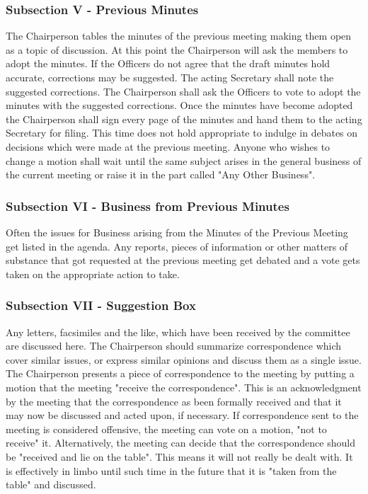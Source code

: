\documentclass[11pt]{article}
\begin{document}
\subsubsection{Subsection V - Previous Minutes}
\label{sec:org00711e0}

The Chairperson tables the minutes of the previous meeting making them open as a topic of discussion. 
At this point the Chairperson will ask the members to adopt the minutes. 
If the Officers do not agree that the draft minutes hold accurate, corrections may be suggested. 
The acting Secretary shall note the suggested corrections. 
The Chairperson shall ask the Officers to vote to adopt the minutes with the suggested corrections.
Once the minutes have become adopted the Chairperson shall sign every page of the minutes and hand them to the acting Secretary for filing.
This time does not hold appropriate to indulge in debates on decisions which were made at the previous meeting. 
Anyone who wishes to change a motion shall wait until the same subject arises in the general business of the current meeting or raise it in the part called "Any Other Business".

\subsubsection{Subsection VI - Business from Previous Minutes}
\label{sec:org1cf2942}

Often the issues for Business arising from the Minutes of the Previous Meeting get listed in the agenda. 
Any reports, pieces of information or other matters of substance that got requested at the previous meeting get debated and a vote gets taken on the appropriate action to take.

\subsubsection{Subsection VII - Suggestion Box}
\label{sec:org0bc7da4}

Any letters, facsimiles and the like, which have been received by the committee are discussed here. 
The Chairperson should summarize correspondence which cover similar issues, or express similar opinions and discuss them as a single issue.
The Chairperson presents a piece of correspondence to the meeting by putting a motion that the meeting "receive the correspondence". 
This is an acknowledgment by the meeting that the correspondence as been formally received and that it may now be discussed and acted upon, if necessary.
If correspondence sent to the meeting is considered offensive, the meeting can vote on a motion, "not to receive" it. 
Alternatively, the meeting can decide that the correspondence should be "received and lie on the table". 
This means it will not really be dealt with. 
It is effectively in limbo until such time in the future that it is "taken from the table" and discussed.
\end{document}
